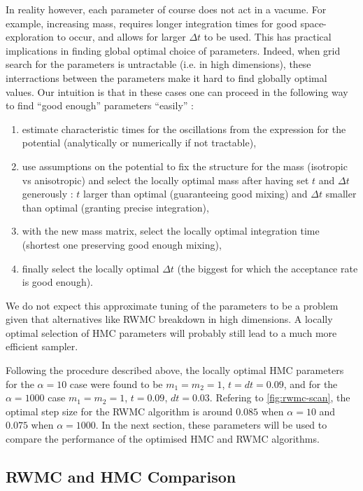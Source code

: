 \documentclass[a4paper, 12pt,oneside]{article}
\begin{document}
			In reality however, each parameter of course does not act in a vacume. For example, increasing mass, requires longer integration times for good space-exploration to occur, and allows for larger $\Delta t$ to be used. This has practical implications in finding global optimal choice of parameters. Indeed, when grid search for the parameters is untractable (i.e. in high dimensions), these interractions between the parameters make it hard to find globally optimal values. Our intuition is that in these cases one can proceed in the following way to find ``good enough'' parameters ``easily'' : 
			\begin{enumerate}
				\item estimate characteristic times for the oscillations from the expression for the potential (analytically or  numerically if not tractable),
				\item use assumptions on the potential to fix the structure for the mass (isotropic vs anisotropic) and select the locally optimal mass after having set $t$ and $\Delta t$ generously : $t$ larger than optimal (guaranteeing good mixing) and $\Delta t$ smaller than optimal (granting precise integration),
				\item with the new mass matrix, select the locally optimal integration time (shortest one preserving good enough mixing),
				\item finally select the locally optimal $\Delta t$ (the biggest for which the acceptance rate is good enough).
			\end{enumerate}
			We do not expect this approximate tuning of the parameters to be a problem given that alternatives like RWMC breakdown in high dimensions. A locally optimal selection of HMC parameters will probably still lead to a much more efficient sampler.

			Following the procedure described above, the locally optimal  HMC parameters for the $\alpha=10$ case were found to be $m_1=m_2=1$, $t=dt=0.09$, and for the $\alpha=1000$ case $m_1=m_2=1$, $t=0.09$, $dt=0.03$. Refering to \ref{fig:rwmc-scan}, the optimal step size for the RWMC algorithm is around $0.085$ when $\alpha=10$ and $0.075$ when $\alpha=1000$. In the next section, these parameters will be used to compare the performance of the optimised HMC and RWMC algorithms.
		\subsection{RWMC and HMC Comparison}
\end{document}
